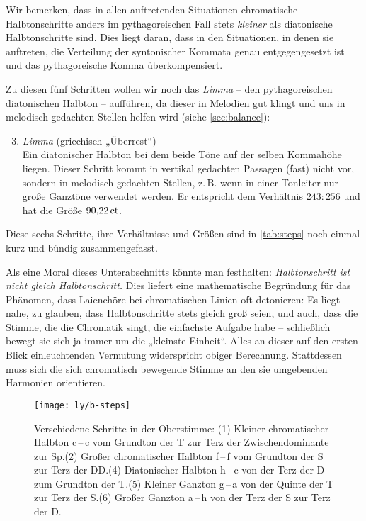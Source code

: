 Wir bemerken, dass in allen auftretenden Situationen chromatische
Halbtonschritte anders im pythagoreischen Fall stets \emph{kleiner} als
diatonische Halbtonschritte sind.  Dies liegt daran, dass in den Situationen,
in denen sie auftreten, die Verteilung der syntonischer Kommata genau
entgegengesetzt ist und das pythagoreische Komma überkompensiert.

Zu diesen fünf Schritten wollen wir noch das \emph{Limma} -- den pythagoreischen
diatonischen Halbton -- aufführen, da dieser in Melodien gut klingt und uns in
melodisch gedachten Stellen helfen wird (siehe \cref{sec:balance}):

\begin{enumerate}\setcounter{enumi}{2}
  \item \emph{Limma} (griechisch „Überrest“)\\
  Ein diatonischer Halbton bei dem beide Töne auf der selben Kommahöhe liegen.
  Dieser Schritt kommt in vertikal gedachten Passagen (fast) nicht vor, sondern
  in melodisch gedachten Stellen, z.\,B. wenn in einer Tonleiter nur große
  Ganztöne verwendet werden. Er entspricht dem Verhältnis $243:256$ und hat die
  Größe $90{,}22\,\text{ct}$.
\end{enumerate}


Diese sechs Schritte, ihre Verhältnisse und Größen sind in \cref{tab:steps} noch
einmal kurz und bündig zusammengefasst.

Als eine Moral dieses Unterabschnitts könnte man festhalten:
\emph{Halbtonschritt ist nicht gleich Halbtonschritt.}  Dies liefert eine
mathematische Begründung für das Phänomen, dass Laienchöre bei chromatischen
Linien oft detonieren: Es liegt nahe, zu glauben, dass Halbtonschritte stets
gleich groß seien, und auch, dass die Stimme, die die Chromatik singt, die
einfachste Aufgabe habe – schließlich bewegt sie sich ja immer um die „kleinste
Einheit“. Alles an dieser auf den ersten Blick einleuchtenden Vermutung
widerspricht obiger Berechnung.  Stattdessen muss sich die sich chromatisch
bewegende Stimme an den sie umgebenden Harmonien orientieren.

\begin{figure}
  \centering
  \texttt{[image: ly/b-steps]}
  \caption{Verschiedene Schritte in der Oberstimme: (1) Kleiner chromatischer
    Halbton c\,–\,\sharpmm c vom Grundton der T zur Terz der Zwischendominante
    zur Sp.\quad (2) Großer chromatischer Halbton f\,–\,\sharpm f vom Grundton
    der S zur Terz der DD.\quad (4) Diatonischer Halbton \naturalm h\,–\,c von
    der Terz der D zum Grundton der T.\quad (5) Kleiner Ganzton
    g\,–\,\naturalm a von der Quinte der T zur Terz der S.\quad (6) Großer
    Ganzton \naturalm a\,–\,\naturalm h von der Terz der S zur Terz der
    D.}\label{fig:steps}
\end{figure}

